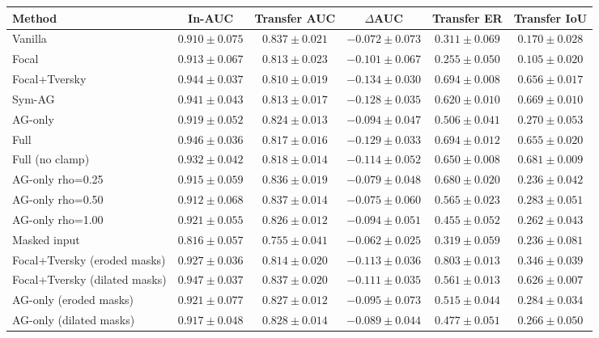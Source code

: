 \begin{tabular}{l c c c c c}
\toprule
\textbf{Method} & \textbf{In-AUC} & \textbf{Transfer AUC} & \textbf{$\Delta$AUC} & \textbf{Transfer ER} & \textbf{Transfer IoU} \\
\midrule
Vanilla & $0.910 \pm 0.075$ & $0.837 \pm 0.021$ & $-0.072 \pm 0.073$ & $0.311 \pm 0.069$ & $0.170 \pm 0.028$ \\
Focal & $0.913 \pm 0.067$ & $0.813 \pm 0.023$ & $-0.101 \pm 0.067$ & $0.255 \pm 0.050$ & $0.105 \pm 0.020$ \\
Focal+Tversky & $0.944 \pm 0.037$ & $0.810 \pm 0.019$ & $-0.134 \pm 0.030$ & $0.694 \pm 0.008$ & $0.656 \pm 0.017$ \\
Sym-AG & $0.941 \pm 0.043$ & $0.813 \pm 0.017$ & $-0.128 \pm 0.035$ & $0.620 \pm 0.010$ & $0.669 \pm 0.010$ \\
AG-only & $0.919 \pm 0.052$ & $0.824 \pm 0.013$ & $-0.094 \pm 0.047$ & $0.506 \pm 0.041$ & $0.270 \pm 0.053$ \\
Full & $0.946 \pm 0.036$ & $0.817 \pm 0.016$ & $-0.129 \pm 0.033$ & $0.694 \pm 0.012$ & $0.655 \pm 0.020$ \\
Full (no clamp) & $0.932 \pm 0.042$ & $0.818 \pm 0.014$ & $-0.114 \pm 0.052$ & $0.650 \pm 0.008$ & $0.681 \pm 0.009$ \\
AG-only rho=0.25 & $0.915 \pm 0.059$ & $0.836 \pm 0.019$ & $-0.079 \pm 0.048$ & $0.680 \pm 0.020$ & $0.236 \pm 0.042$ \\
AG-only rho=0.50 & $0.912 \pm 0.068$ & $0.837 \pm 0.014$ & $-0.075 \pm 0.060$ & $0.565 \pm 0.023$ & $0.283 \pm 0.051$ \\
AG-only rho=1.00 & $0.921 \pm 0.055$ & $0.826 \pm 0.012$ & $-0.094 \pm 0.051$ & $0.455 \pm 0.052$ & $0.262 \pm 0.043$ \\
Masked input & $0.816 \pm 0.057$ & $0.755 \pm 0.041$ & $-0.062 \pm 0.025$ & $0.319 \pm 0.059$ & $0.236 \pm 0.081$ \\
Focal+Tversky (eroded masks) & $0.927 \pm 0.036$ & $0.814 \pm 0.020$ & $-0.113 \pm 0.036$ & $0.803 \pm 0.013$ & $0.346 \pm 0.039$ \\
Focal+Tversky (dilated masks) & $0.947 \pm 0.037$ & $0.837 \pm 0.020$ & $-0.111 \pm 0.035$ & $0.561 \pm 0.013$ & $0.626 \pm 0.007$ \\
AG-only (eroded masks) & $0.921 \pm 0.077$ & $0.827 \pm 0.012$ & $-0.095 \pm 0.073$ & $0.515 \pm 0.044$ & $0.284 \pm 0.034$ \\
AG-only (dilated masks) & $0.917 \pm 0.048$ & $0.828 \pm 0.014$ & $-0.089 \pm 0.044$ & $0.477 \pm 0.051$ & $0.266 \pm 0.050$ \\
\bottomrule
\end{tabular}
